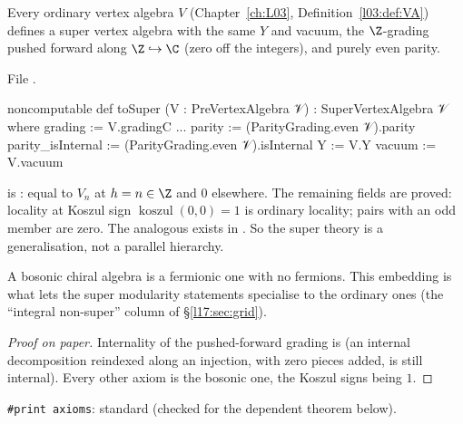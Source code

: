 \begin{proposition}\label{l17:prop:tosuper}
Every ordinary vertex algebra $V$ (Chapter~\ref{ch:L03}, Definition~\ref{l03:def:VA}) defines a super
vertex algebra with the same $Y$ and vacuum, the $\Z$-grading pushed forward along $\Z\hookrightarrow\C$
(zero off the integers), and purely even parity.
\end{proposition}
\noindent File .
\begin{leancode}
noncomputable def toSuper (V : PreVertexAlgebra 𝒱) : SuperVertexAlgebra 𝒱 where
  grading := V.gradingC
...
  parity := (ParityGrading.even 𝒱).parity
  parity_isInternal := (ParityGrading.even 𝒱).isInternal
  Y := V.Y
  vacuum := V.vacuum
\end{leancode}
\begin{dictionary}
 is : equal to $V_n$ at
$h=n\in\Z$ and $0$ elsewhere. The remaining fields are proved: locality at Koszul sign
$\operatorname{koszul}(0,0)=1$ is ordinary locality; pairs with an odd member are zero. The
analogous  exists in . So the super theory is a generalisation, not a parallel hierarchy.
\end{dictionary}
\begin{physics}
A bosonic chiral algebra is a fermionic one with no fermions. This embedding is what lets the
super modularity statements specialise to the ordinary ones (the ``integral non-super'' column of
§\ref{l17:sec:grid}).
\end{physics}
\begin{proof}[Proof on paper]
Internality of the pushed-forward grading is  (an internal decomposition
reindexed along an injection, with zero pieces added, is still internal). Every other axiom is the
bosonic one, the Koszul signs being $1$.
\end{proof}
\begin{status}
\texttt{\#print axioms}: standard (checked for the dependent theorem below).
\end{status}

